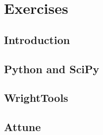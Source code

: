 \chapter{Exercises} \label{cha:exer}

\clearpage

\section{Introduction}  %

\clearpage

\section{Python and SciPy}  %

\section{WrightTools}  %

\section{Attune}  %

\clearpage
